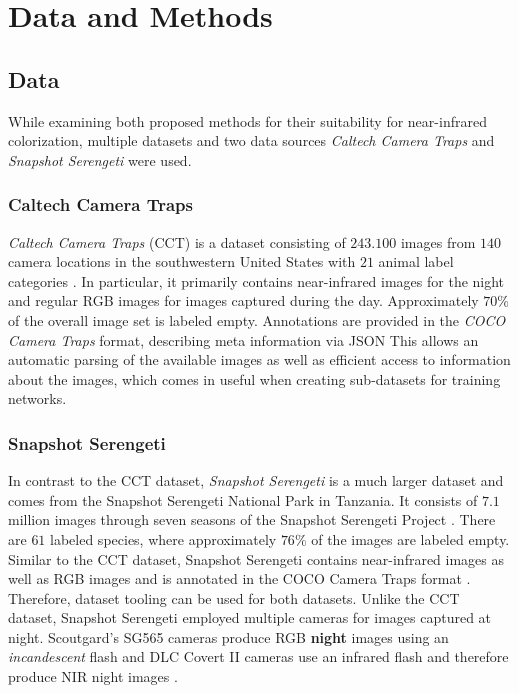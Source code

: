 \chapter{Data and Methods}

\section{Data}
While examining both proposed methods for their suitability for near-infrared colorization, multiple datasets
and two data sources \textit{Caltech Camera Traps} \parencite{caltech} and \textit{Snapshot Serengeti} \parencite{serengeti} were used.

\subsection{Caltech Camera Traps}
\label{sec:cct}
\textit{Caltech Camera Traps} (CCT) is a dataset consisting of $243.100$ images from $140$ camera locations
in the southwestern United States with $21$ animal label categories \parencite{caltech}.
In particular, it primarily contains near-infrared images for the night and regular RGB images for images captured during the day.
Approximately $70 \%$ of the overall image set is labeled empty.
Annotations are provided in the \textit{COCO Camera Traps} format, describing meta information via JSON \parencite{caltech}
This allows an automatic parsing of the available images as well as efficient access to information about
the images, which comes in useful when creating sub-datasets for training networks.

\subsection{Snapshot Serengeti}
In contrast to the CCT dataset, \textit{Snapshot Serengeti} is a much larger dataset and comes from the Snapshot Serengeti National Park in Tanzania.
It consists of $7.1$ million images through seven seasons of the Snapshot Serengeti Project \parencite{serengeti}.
There are $61$ labeled species, where approximately $76\%$ of the images are labeled empty.
Similar to the CCT dataset, Snapshot Serengeti contains near-infrared images as well as RGB images and
is annotated in the COCO Camera Traps format \parencite{serengeti}. Therefore, dataset tooling can be used for both datasets.
Unlike the CCT dataset, Snapshot Serengeti employed multiple cameras for images captured at night.
Scoutgard's SG565 cameras produce RGB \textbf{night} images using an \textit{incandescent} flash and DLC Covert II cameras use an infrared flash and therefore produce NIR night images \parencite{serengeti}.

